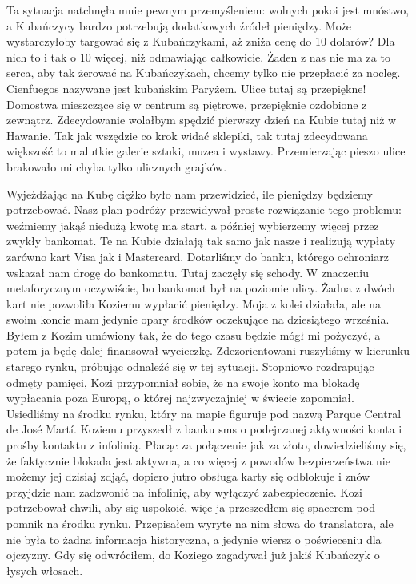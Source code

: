 Ta sytuacja natchnęła mnie pewnym przemyśleniem: wolnych pokoi jest mnóstwo, a Kubańczycy bardzo potrzebują dodatkowych źródeł pieniędzy.
Może wystarczyłoby targować się z Kubańczykami, aż zniża cenę do 10 dolarów?
Dla nich to i tak o 10 więcej, niż odmawiając całkowicie.
Żaden z nas nie ma za to serca, aby tak żerować na Kubańczykach, chcemy tylko nie przepłacić za nocleg. 
Cienfuegos nazywane jest kubańskim Paryżem.
Ulice tutaj są przepiękne!
Domostwa mieszczące się w centrum są piętrowe, przepięknie ozdobione z zewnątrz.
Zdecydowanie wolałbym spędzić pierwszy dzień na Kubie tutaj niż w Hawanie.
Tak jak wszędzie co krok widać sklepiki, tak tutaj zdecydowana większość to malutkie galerie sztuki, muzea i wystawy.
Przemierzając pieszo ulice brakowało mi chyba tylko ulicznych grajków.
\par Wyjeżdżając na Kubę ciężko było nam przewidzieć, ile pieniędzy będziemy potrzebować.
Nasz plan podróży przewidywał proste rozwiązanie tego problemu: weźmiemy jakąś niedużą kwotę ma start, a później wybierzemy więcej przez zwykły bankomat.
Te na Kubie działają tak samo jak nasze i realizują wypłaty zarówno kart Visa jak i Mastercard.
Dotarliśmy do banku, którego ochroniarz wskazał nam drogę do bankomatu.
Tutaj zaczęły się schody.
W znaczeniu metaforycznym oczywiście, bo bankomat był na poziomie ulicy.
Żadna z dwóch kart nie pozwoliła Koziemu wypłacić pieniędzy.
Moja z kolei działała, ale na swoim koncie mam jedynie opary środków oczekujące na dziesiątego września.
Byłem z Kozim umówiony tak, że do tego czasu będzie mógł mi pożyczyć, a potem ja będę dalej finansował wycieczkę.
Zdezorientowani ruszyliśmy w kierunku starego rynku, próbując odnaleźć się w tej sytuacji.
Stopniowo rozdrapując odmęty pamięci, Kozi przypomniał sobie, że na swoje konto ma blokadę wypłacania poza Europą, o której najzwyczajniej w świecie zapomniał.
Usiedliśmy na środku rynku, który na mapie figuruje pod nazwą Parque Central de José Martí.
Koziemu przyszedł z banku sms o podejrzanej aktywności konta i prośby kontaktu z infolinią.
Płacąc za połączenie jak za złoto, dowiedzieliśmy się, że faktycznie blokada jest aktywna, a co więcej z powodów bezpieczeństwa nie możemy jej dzisiaj zdjąć, dopiero jutro obsługa karty się odblokuje i znów przyjdzie nam zadzwonić na infolinię, aby wyłączyć zabezpieczenie.
Kozi potrzebował chwili, aby się uspokoić, więc ja przeszedłem się spacerem pod pomnik na środku rynku.
Przepisałem wyryte na nim słowa do translatora, ale nie była to żadna informacja historyczna, a jedynie wiersz o poświeceniu dla ojczyzny.
Gdy się odwróciłem, do Koziego zagadywał już jakiś Kubańczyk o łysych włosach.
